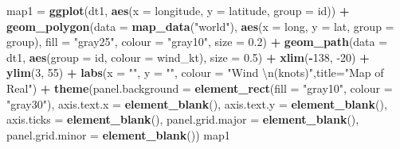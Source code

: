 \documentclass[]{article}
\newenvironment{Shaded}{\begin{snugshade}}{\end{snugshade}}
\newcommand{\CharTok}[1]{\textcolor[rgb]{0.31,0.60,0.02}{#1}}
\newcommand{\DataTypeTok}[1]{\textcolor[rgb]{0.13,0.29,0.53}{#1}}
\newcommand{\DecValTok}[1]{\textcolor[rgb]{0.00,0.00,0.81}{#1}}
\newcommand{\FloatTok}[1]{\textcolor[rgb]{0.00,0.00,0.81}{#1}}
\newcommand{\KeywordTok}[1]{\textcolor[rgb]{0.13,0.29,0.53}{\textbf{#1}}}
\newcommand{\NormalTok}[1]{#1}
\newcommand{\OperatorTok}[1]{\textcolor[rgb]{0.81,0.36,0.00}{\textbf{#1}}}
\newcommand{\StringTok}[1]{\textcolor[rgb]{0.31,0.60,0.02}{#1}}
\begin{document}
\begin{Shaded}
\begin{Highlighting}[]
\NormalTok{map1 =}\StringTok{ }\KeywordTok{ggplot}\NormalTok{(dt1, }\KeywordTok{aes}\NormalTok{(}\DataTypeTok{x =}\NormalTok{ longitude, }\DataTypeTok{y =}\NormalTok{ latitude, }\DataTypeTok{group =}\NormalTok{ id)) }\OperatorTok{+}\StringTok{ }
\StringTok{  }\KeywordTok{geom_polygon}\NormalTok{(}\DataTypeTok{data =} \KeywordTok{map_data}\NormalTok{(}\StringTok{"world"}\NormalTok{), }
               \KeywordTok{aes}\NormalTok{(}\DataTypeTok{x =}\NormalTok{ long, }\DataTypeTok{y =}\NormalTok{ lat, }\DataTypeTok{group =}\NormalTok{ group), }
               \DataTypeTok{fill =} \StringTok{"gray25"}\NormalTok{, }\DataTypeTok{colour =} \StringTok{"gray10"}\NormalTok{, }\DataTypeTok{size =} \FloatTok{0.2}\NormalTok{) }\OperatorTok{+}\StringTok{ }
\StringTok{  }\KeywordTok{geom_path}\NormalTok{(}\DataTypeTok{data =}\NormalTok{ dt1, }\KeywordTok{aes}\NormalTok{(}\DataTypeTok{group =}\NormalTok{ id, }\DataTypeTok{colour =}\NormalTok{ wind_kt), }\DataTypeTok{size =} \FloatTok{0.5}\NormalTok{) }\OperatorTok{+}\StringTok{ }
\StringTok{  }\KeywordTok{xlim}\NormalTok{(}\OperatorTok{-}\DecValTok{138}\NormalTok{, }\DecValTok{-20}\NormalTok{) }\OperatorTok{+}\StringTok{ }\KeywordTok{ylim}\NormalTok{(}\DecValTok{3}\NormalTok{, }\DecValTok{55}\NormalTok{) }\OperatorTok{+}\StringTok{ }
\StringTok{  }\KeywordTok{labs}\NormalTok{(}\DataTypeTok{x =} \StringTok{""}\NormalTok{, }\DataTypeTok{y =} \StringTok{""}\NormalTok{, }\DataTypeTok{colour =} \StringTok{"Wind }\CharTok{\textbackslash{}n}\StringTok{(knots)"}\NormalTok{,}\DataTypeTok{title=}\StringTok{"Map of Real"}\NormalTok{) }\OperatorTok{+}\StringTok{ }
\StringTok{  }\KeywordTok{theme}\NormalTok{(}\DataTypeTok{panel.background =} \KeywordTok{element_rect}\NormalTok{(}\DataTypeTok{fill =} \StringTok{"gray10"}\NormalTok{, }\DataTypeTok{colour =} \StringTok{"gray30"}\NormalTok{),}
        \DataTypeTok{axis.text.x =} \KeywordTok{element_blank}\NormalTok{(), }\DataTypeTok{axis.text.y =} \KeywordTok{element_blank}\NormalTok{(), }
        \DataTypeTok{axis.ticks =} \KeywordTok{element_blank}\NormalTok{(), }\DataTypeTok{panel.grid.major =} \KeywordTok{element_blank}\NormalTok{(),}
        \DataTypeTok{panel.grid.minor =} \KeywordTok{element_blank}\NormalTok{())}
\NormalTok{map1}
\end{Highlighting}
\end{Shaded}
\end{document}
